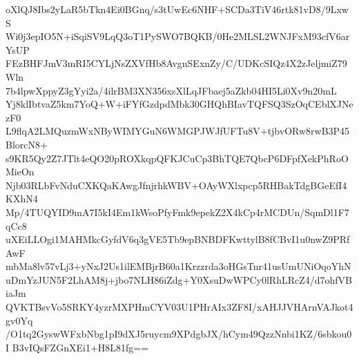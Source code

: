 oXlQJ8Ibs2yLaR5bTkn4Ei0BGnq/s3tUwEc6NHF+SCDa3TiV46rtk81vD8/9LxwS
Wi0j3epIO5N+iSqiSV9LqQ3oT1PySWO7BQKB/0He2MLSL2WNJFxM93cfV6arYsUP
FEzBHFJmV3mRI5CYLjNsZXVfHb8AvgnSExnZy/C/UDKcSIQz4X2zJeljmiZ79Wln
7b4lpwXppyZ3gYyi2a/4ilrBM3XN356xsXlLqJFbaej5aZkb04HI5Li0Xv9n20mL
Yj8klIbtvaZ5km7YoQ+W+iFYfGzdpdMbk30GHQhBIavTQFSQ3SzOqCEblXJNezF0
L9flqA2LMQuzmWxNByWIMYGuN6WMGPJWJfUFTu8V+tjbvORw8rwB3P45BlorcN8+
s9KR5Qy2Z7JTlt4eQO20pROXkqpQFKJCuCp3BhTQE7QbcP6DFpfXekPhRoOMieOn
Njb03RLbFvNduCXKQaKAwgJfnjrhkWBV+OAyWXlxpcp5RHBakTdgBGeEfI4KXhN4
Mp/4TUQYID9mA7I5kI4Em1kWsoPfyFmk9epekZ2X4kCp4rMCDUn/SqmDl1F7qCc8
uXEiLLOgi1MAHMkcGyfdV6q3gVE5Tb9epBNBDFKwttylB8fCBvI1u0nwZ9PRfAwF
mbMa8lv57vLj3+yNxJ2Us1ilEMBjrB60a1Krzzrda3oHGsTnr41usUmUNiOqoYhN
uDmYzJUN5F2LhAM8j+jbo7NLH86iZdg+Y0XsuDwWPCy0lRhLRcZ4/d7ohfVBiaJm
QVKTBsvVo5SRKY4yzrMXPHmCYV03U1PHrAIx3ZF8I/xAHJJVHArnVAJkot4gv0Yq
/O1tq2GyswWFxbNbg1pI9dXJ5ruycm9XPdgbJX/hCym49QzzNnbi1KZ/6sbkou0I
B3vIQsFZGnXEi1+H8L81fg==
